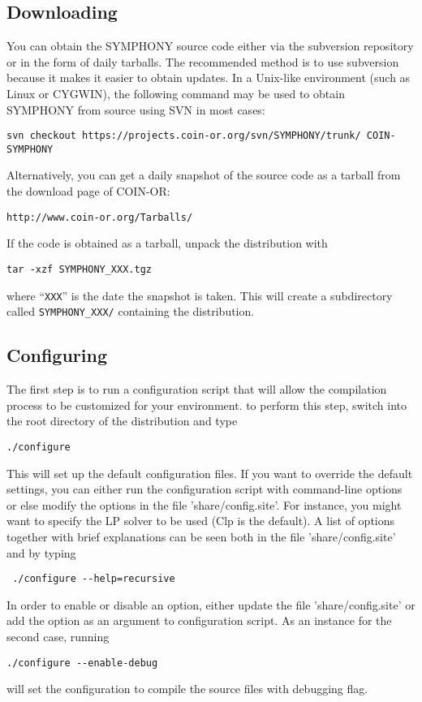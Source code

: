 \subsection{Downloading}

You can obtain the SYMPHONY source code either via the subversion repository
or in the form of daily tarballs. The recommended method is to use subversion
because it makes it easier to obtain updates. In a Unix-like environment (such
as Linux or CYGWIN), the following command may be used to obtain SYMPHONY from
source using SVN in most cases:
\begin{verbatim}
svn checkout https://projects.coin-or.org/svn/SYMPHONY/trunk/ COIN-SYMPHONY
\end{verbatim}
Alternatively, you can get a daily snapshot of the source code as a tarball
from the download page of COIN-OR:
\begin{verbatim}
http://www.coin-or.org/Tarballs/
\end{verbatim}
If the code is obtained as a tarball, unpack the distribution with 
\begin{verbatim}
tar -xzf SYMPHONY_XXX.tgz
\end{verbatim}
where ``\texttt{XXX}'' is the date the snapshot is taken. This will create a
subdirectory called \texttt{SYMPHONY\_XXX/} containing the distribution.

\subsection{Configuring}

The first step is to run a configuration script that will allow the
compilation process to be customized for your environment. to perform this
step, switch into the root directory of the distribution and type
\begin{verbatim}
./configure 
\end{verbatim}
This will set up the default configuration files. If you want to override the
default settings, you can either run the configuration script with
command-line options or else modify the options in the file
'share/config.site'. For instance, you might want to specify the LP solver to
be used (Clp is the default). A list of options together with brief
explanations can be seen both in the file 'share/config.site' and by typing
\begin{verbatim}
 ./configure --help=recursive 
\end{verbatim}
In order to enable or disable an option, either update the file 
'share/config.site' or add the option as an argument to configuration script. 
As an instance for the second case, running 
\begin{verbatim}
./configure --enable-debug
\end{verbatim}
will set the configuration to compile the source files with debugging
flag. 


